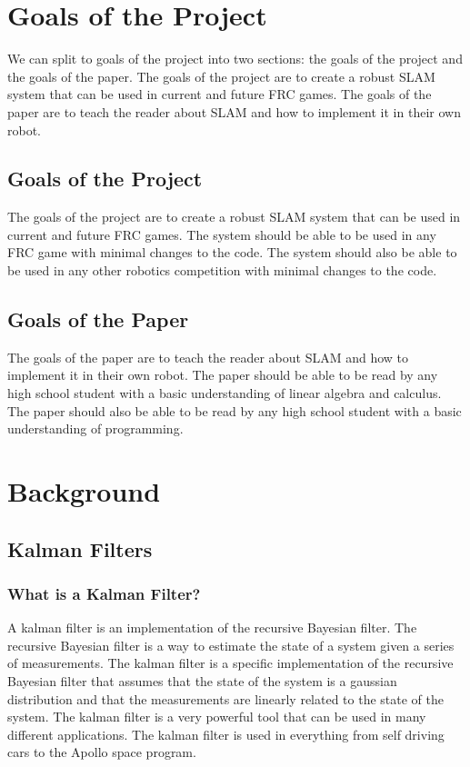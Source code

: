 \documentclass{scrartcl}
\begin{document}
\newpage
\section{Goals of the Project}
We can split to goals of the project into two sections: the goals of the project and the goals of the paper. The goals of the project are to create a robust SLAM system that can be used in current and future FRC games. The goals of the paper are to teach the reader about SLAM and how to implement it in their own robot.

\subsection{Goals of the Project}
The goals of the project are to create a robust SLAM system that can be used in current and future FRC games. The system should be able to be used in any FRC game with minimal changes to the code. The system should also be able to be used in any other robotics competition with minimal changes to the code.

\subsection{Goals of the Paper}
The goals of the paper are to teach the reader about SLAM and how to implement it in their own robot. The paper should be able to be read by any high school student with a basic understanding of linear algebra and calculus. The paper should also be able to be read by any high school student with a basic understanding of programming.

\newpage
\section{Background}
\subsection{Kalman Filters}
\subsubsection{What is a Kalman Filter?}
A kalman filter is an implementation of the recursive Bayesian filter. The recursive Bayesian filter is a way to estimate the state of a system given a series of measurements. The kalman filter is a specific implementation of the recursive Bayesian filter that assumes that the state of the system is a gaussian distribution and that the measurements are linearly related to the state of the system. The kalman filter is a very powerful tool that can be used in many different applications. The kalman filter is used in everything from self driving cars to the Apollo space program.
\end{document}
